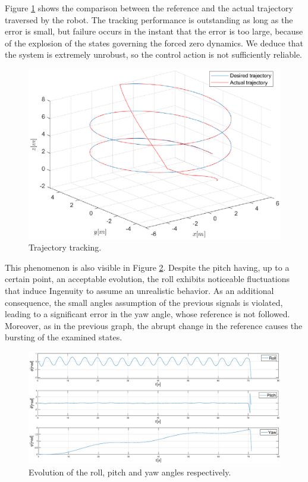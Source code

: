 Figure \ref{fig:FL_trajectory} shows the comparison between the reference and the actual trajectory traversed by the robot. The tracking performance is outstanding as long as the error is small, but failure occurs in the instant that the error is too large, because of the explosion of the states governing the forced zero dynamics. We deduce that the system is extremely unrobust, so the control action is not sufficiently reliable.
\begin{figure}[H]
    \centering
    \includegraphics[scale=0.5]{figures/FL_trajectory}
    \caption{Trajectory tracking.}
    \label{fig:FL_trajectory}
\end{figure}
This phenomenon is also visible in Figure \ref{fig:FL_attitude}. Despite the pitch having, up to a certain point, an acceptable evolution, the roll exhibits noticeable fluctuations that induce Ingenuity to assume an unrealistic behavior. As an additional consequence, the small angles assumption of the previous signals is violated, leading to a significant error in the yaw angle, whose reference is not followed. Moreover, as in the previous graph, the abrupt change in the reference causes the bursting of the examined states.
\begin{figure}[H]
    \centering
    \includegraphics[scale=0.2]{figures/FL_attitude}
    \caption{Evolution of the roll, pitch and yaw angles respectively.}
    \label{fig:FL_attitude}
\end{figure}
